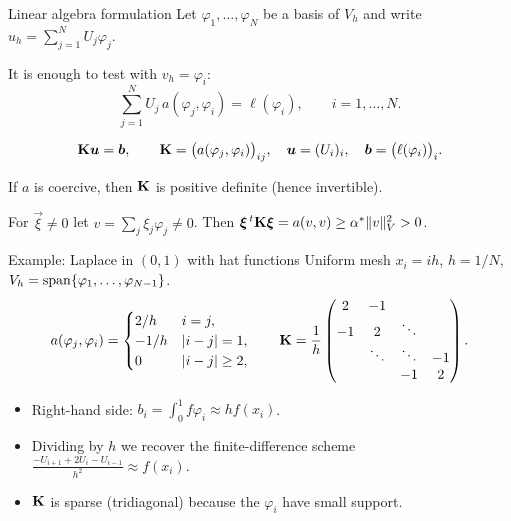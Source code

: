 \begin{frame}{Linear algebra formulation}
    Let $\varphi_1, \dots, \varphi_N$ be a basis of $V_h$ and write $u_h = \sum_{j=1}^N U_j \varphi_j$.
    \medskip

    It is enough to test with $v_h = \varphi_i$:
    \[
        \sum_{j=1}^N U_j\, a(\varphi_j, \varphi_i) = \ell(\varphi_i), \qquad i = 1, \dots, N.
    \]
    \begin{definition}
        \[
            \mathbf{K} \bm{u} = \bm{b}, \qquad \mathbf{K} = \big( a(\varphi_j, \varphi_i) \big)_{ij}, \quad \bm{u} = (U_i)_i, \quad \bm{b} = \big(\ell(\varphi_i)\big)_i .
        \]
    \end{definition}
    \begin{lemma}
        If $a$ is coercive, then $\mathbf{K}$ is positive definite (hence invertible).
    \end{lemma}
    \begin{proofsteps}[Proof]
        For $\vec \xi \ne 0$ let $v = \sum_j \xi_j \varphi_j \neq 0$. Then $\bm{\xi}^{\,t} \mathbf{K} \bm{\xi} = a(v,v) \ge \alpha^* \|v\|_V^2 > 0$.
    \end{proofsteps}
\end{frame}

\begin{frame}{Example: Laplace in $(0,1)$ with hat functions}
    Uniform mesh $x_i = ih$, $h = 1/N$, $V_h = \operatorname{span}\{\varphi_1, \dots, \varphi_{N-1}\}$.
    \[
        a(\varphi_j, \varphi_i) =
        \begin{cases}
            2/h  & i = j,       \\
            -1/h & |i - j| = 1, \\
            0    & |i-j| \ge 2,
        \end{cases}
        \qquad
        \mathbf{K} = \frac 1 h
        \begin{pmatrix}
            2  & -1     &        &    \\
            -1 & 2      & \ddots &    \\
               & \ddots & \ddots & -1 \\
               &        & -1     & 2
        \end{pmatrix}.
    \]
    \begin{itemize}
        \item Right-hand side: $b_i = \int_0^1 f \varphi_i \approx h f(x_i)$.
        \item Dividing by $h$ we recover the \alert{finite-difference scheme}
              $\frac{-U_{i+1} + 2U_i - U_{i-1}}{h^2} \approx f(x_i)$.
        \item $\mathbf{K}$ is sparse (tridiagonal) because the $\varphi_i$ have small support.
    \end{itemize}
\end{frame}

